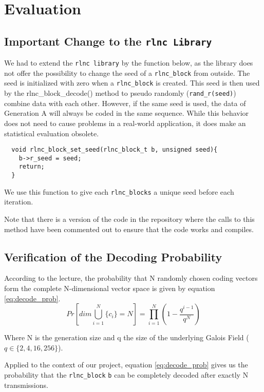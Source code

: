 \documentclass[a4paper,english,10pt]{tumarticle}
\begin{document}
\section{Evaluation}\label{sec:eval}
\subsection{Important Change to the \texttt{rlnc Library}}
We had to extend the \texttt{rlnc library} by the function below, as the 
library does not offer the possibility to change the seed of a \texttt{rlnc\_block} from outside. The seed is 
initialized with zero when a \texttt{rlnc\_block} is created. This seed is then used by the rlnc\_block\_decode() 
method to pseudo randomly (\texttt{rand\_r(seed)}) combine data with each other. However, if the same seed is used, the 
data of Generation A will always be coded in the same sequence. 
While this behavior does not need to cause problems in a real-world application, it does make an statistical evaluation obsolete.

\lstset{language=C}
\begin{lstlisting}
  void rlnc_block_set_seed(rlnc_block_t b, unsigned seed){
    b->r_seed = seed;
    return;
  }
\end{lstlisting}

We use this function to give each \texttt{rlnc\_blocks} a unique seed before each iteration.

Note that there is a version of the code in the repository where the calls to this method 
have been commented out to ensure that the code works and compiles.

\subsection{Verification of the Decoding Probability}
According to the lecture, the probability that N randomly chosen coding vectors form
the complete N-dimensional vector space is given by equation \ref{eq:decode_prob}.
\begin{equation} 
  Pr[dim\bigcup_{i=1}^{N}\{c_i\} = N] = \prod_{i=1}^{N} (1 - \frac{q^{i - 1}}{q ^ {N}})
  \label{eq:decode_prob}
\end{equation}

Where N is the generation size and q the size of the underlying Galois Field ($q \in \{2,4,16,256\}$).

Applied to the context of our project, equation \ref{eq:decode_prob} gives us the probability that the 
\texttt{rlnc\_block} \texttt{b} can be completely decoded after exactly N transmissions.
\end{document}

